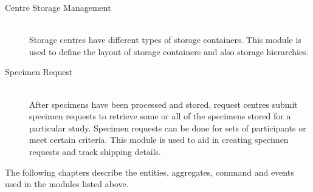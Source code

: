 \begin{description}
\item[Centre Storage Management] \hfill \\ Storage centres have different
  types of storage containers. This module is used to define the layout of
  storage containers and also storage hierarchies.

\item[Specimen Request] \hfill \\ After specimens have been processed and
  stored, request centres submit specimen requests to retrieve some or all of
  the specimens stored for a particular study. Specimen requests can be done
  for sets of participants or meet certain criteria. This module is used to
  aid in creating specimen requests and track shipping details.

\end{description}

The following chapters describe the entities, aggregates, command and events
used in the  modules listed above.


